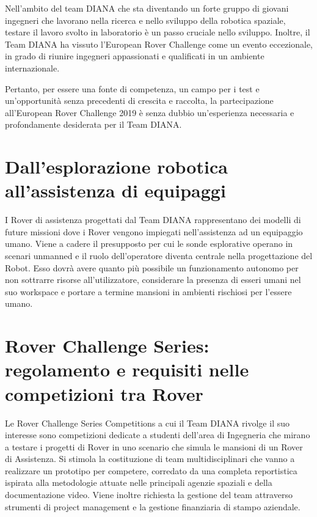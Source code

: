 \documentclass[%
corpo=11pt,
twoside,
 stile=classica,
oldstyle,
greek,%
]{toptesi}
\begin{document}
Nell'ambito del team DIANA che sta diventando un forte gruppo di giovani ingegneri che lavorano nella ricerca e nello sviluppo della robotica spaziale, testare il lavoro svolto in laboratorio è un passo cruciale nello sviluppo.
Inoltre, il Team DIANA ha vissuto l'European Rover Challenge come un evento eccezionale, in grado di riunire ingegneri appassionati e qualificati in un ambiente internazionale.

Pertanto, per essere una fonte di competenza, un campo per i test e un'opportunità senza precedenti di crescita e raccolta, la partecipazione all'European Rover Challenge 2019 è senza dubbio un'esperienza necessaria e profondamente desiderata per il Team DIANA.

	\section{Dall'esplorazione robotica all'assistenza di equipaggi}
	I Rover di assistenza progettati dal Team DIANA rappresentano dei modelli di future missioni dove i Rover vengono impiegati nell'assistenza ad un equipaggio umano. Viene a cadere il presupposto per cui le sonde esplorative operano in scenari unmanned e il ruolo dell'operatore diventa centrale nella progettazione del Robot. Esso dovrà avere quanto più possibile un funzionamento autonomo per non sottrarre risorse all'utilizzatore, considerare la presenza di esseri umani nel suo workspace e portare a termine mansioni in ambienti rischiosi per l'essere umano. 
	 
		
	\section{Rover Challenge Series: regolamento e requisiti nelle competizioni tra Rover}
	Le Rover Challenge Series Competitions a cui il Team DIANA rivolge il suo interesse sono competizioni dedicate a studenti dell'area di Ingegneria che mirano a testare i progetti di Rover in uno scenario che simula le mansioni di un Rover di Assistenza.
	Si stimola la costituzione di team multidisciplinari che vanno a realizzare un prototipo per competere, corredato da una completa reportistica ispirata alla metodologie attuate nelle principali agenzie spaziali e della documentazione video. Viene inoltre richiesta la gestione del team attraverso strumenti di project management e la gestione finanziaria di stampo aziendale.
 
\end{document}
